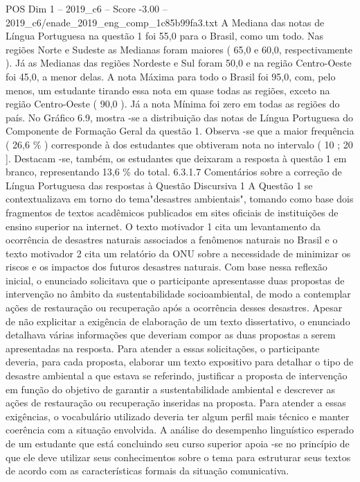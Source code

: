 \begin{textsample}{POS Dim 1 – 2019\_c6 – Score -3.00 – 2019\_c6/enade\_2019\_eng\_comp\_1c85b99fa3.txt}
A Mediana das notas de Língua Portuguesa na questão 1 foi 55,0 para o Brasil, como um todo.
Nas regiões Norte e Sudeste as Medianas foram maiores ( 65,0 e 60,0, respectivamente ).
Já as Medianas das regiões Nordeste e Sul foram 50,0 e na região Centro-Oeste foi 45,0, a menor delas.
A nota Máxima para todo o Brasil foi 95,0, com, pelo menos, um estudante tirando essa nota em quase todas as regiões, exceto na região Centro-Oeste ( 90,0 ).
Já a nota Mínima foi zero em todas as regiões do país.
No Gráfico 6.9, mostra -se a distribuição das notas de Língua Portuguesa do Componente de Formação Geral da questão 1.
Observa -se que a maior frequência ( 26,6 \% ) corresponde à dos estudantes que obtiveram nota no intervalo ( 10 ; 20 ].
Destacam -se, também, os estudantes que deixaram a resposta à questão 1 em branco, representando 13,6 \% do total. 6.3.1.7 Comentários sobre a correção de Língua Portuguesa das respostas à Questão Discursiva 1 A Questão 1 se contextualizava em torno do tema"desastres ambientais", tomando como base dois fragmentos de textos acadêmicos publicados em sites oficiais de instituições de ensino superior na internet.
O texto motivador 1 cita um levantamento da ocorrência de desastres naturais associados a fenômenos naturais no Brasil e o texto motivador 2 cita um relatório da ONU sobre a necessidade de minimizar os riscos e os impactos dos futuros desastres naturais.
Com base nessa reflexão inicial, o enunciado solicitava que o participante apresentasse duas propostas de intervenção no âmbito da sustentabilidade socioambiental, de modo a contemplar ações de restauração ou recuperação após a ocorrência desses desastres.
Apesar de não explicitar a exigência de elaboração de um texto dissertativo, o enunciado detalhava várias informações que deveriam compor as duas propostas a serem apresentadas na resposta.
Para atender a essas solicitações, o participante deveria, para cada proposta, elaborar um texto expositivo para detalhar o tipo de desastre ambiental a que estava se referindo, justificar a proposta de intervenção em função do objetivo de garantir a sustentabilidade ambiental e descrever as ações de restauração ou recuperação inseridas na proposta.
Para atender a essas exigências, o vocabulário utilizado deveria ter algum perfil mais técnico e manter coerência com a situação envolvida.
A análise do desempenho linguístico esperado de um estudante que está concluindo seu curso superior apoia -se no princípio de que ele deve utilizar seus conhecimentos sobre o tema para estruturar seus textos de acordo com as características formais da situação comunicativa.

\end{textsample}
